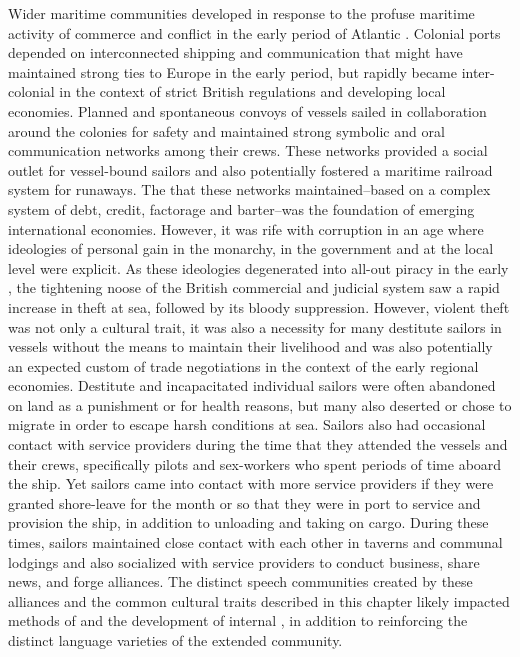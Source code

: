 Wider maritime communities developed in response to the profuse maritime activity of commerce and conflict in the early period of Atlantic . Colonial ports depended on interconnected shipping and communication that might have maintained strong ties to Europe in the early period, but rapidly became inter-colonial in the context of strict British regulations and developing local economies. Planned and spontaneous convoys of vessels sailed in collaboration around the colonies for safety and maintained strong symbolic and oral communication networks among their crews. These networks provided a social outlet for vessel-bound sailors and also potentially fostered a maritime railroad system for runaways. The  that these networks maintained–based on a complex system of debt, credit, factorage and barter–was the foundation of emerging international economies. However, it was rife with corruption in an age where ideologies of personal gain in the monarchy, in the government and at the local level were explicit. As these ideologies degenerated into all-out piracy in the early , the tightening noose of the British commercial and judicial system saw a rapid increase in theft at sea, followed by its bloody suppression. However, violent theft was not only a cultural trait, it was also a necessity for many destitute sailors in vessels without the means to maintain their livelihood and was also potentially an expected custom of trade negotiations in the context of the early regional economies. Destitute and incapacitated individual sailors were often abandoned on land as a punishment or for health reasons, but many also deserted or chose to migrate in order to escape harsh conditions at sea. Sailors also had occasional contact with service providers during the time that they attended the vessels and their crews, specifically pilots and sex-workers who spent periods of time aboard the ship. Yet sailors came into contact with more service providers if they were granted shore-leave for the month or so that they were in port to service and provision the ship, in addition to unloading and taking on cargo. During these times, sailors maintained close contact with each other in taverns and communal lodgings and also socialized with service providers to conduct business, share news, and forge alliances. The distinct speech communities created by these alliances and the common cultural traits described in this chapter likely impacted methods of  and the development of internal , in addition to reinforcing the distinct language varieties of the extended  community. 